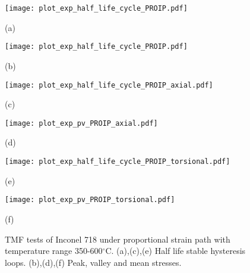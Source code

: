 \begin{figure}
  \begin{minipage}[t]{0.5\linewidth} %
  \nonumber
    \centering
    \texttt{[image: plot\_exp\_half\_life\_cycle\_PROIP.pdf]}
    \centerline{(a)}
  \end{minipage}%
  \begin{minipage}[t]{0.5\linewidth}
    \centering
    \texttt{[image: plot\_exp\_half\_life\_cycle\_PROIP.pdf]}
    \centerline{(b)}
  \end{minipage}

  \begin{minipage}[t]{0.5\linewidth} %
  \nonumber
    \centering
    \texttt{[image: plot\_exp\_half\_life\_cycle\_PROIP\_axial.pdf]}
    \centerline{(c)}
  \end{minipage}%
  \begin{minipage}[t]{0.5\linewidth}
    \centering
    \texttt{[image: plot\_exp\_pv\_PROIP\_axial.pdf]}
    \centerline{(d)}
  \end{minipage}

  \begin{minipage}[t]{0.5\linewidth} %
  \nonumber
    \centering
    \texttt{[image: plot\_exp\_half\_life\_cycle\_PROIP\_torsional.pdf]}
    \centerline{(e)}
  \end{minipage}%
  \begin{minipage}[t]{0.5\linewidth}
    \centering
    \texttt{[image: plot\_exp\_pv\_PROIP\_torsional.pdf]}
    \centerline{(f)}
  \end{minipage}
  \caption{TMF tests of Inconel 718 under proportional strain path with temperature range 350-600$^{\circ}$C.
  (a),(c),(e) Half life stable hysteresis loops.
  (b),(d),(f) Peak, valley and mean stresses.}
  \label{Fig:plot_exp_TCTMF}
\end{figure}


